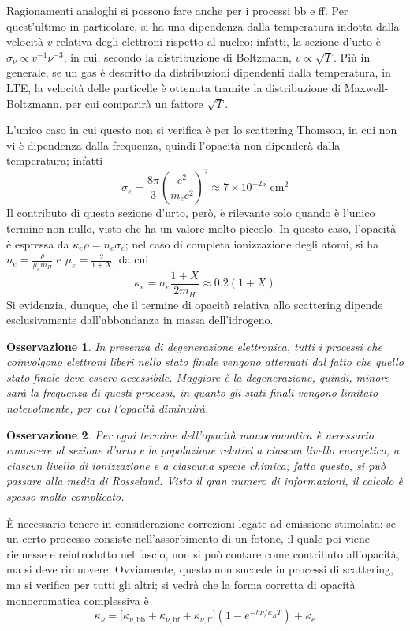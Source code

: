 \documentclass[11pt, a4paper]{scrartcl}
\theoremstyle{style}
\newtheorem{osservazione}{Osservazione}[section]
\theoremstyle{style1}
\numberwithin{equation}{subsection}
\begin{document}
Ragionamenti analoghi si possono fare anche per i processi bb e ff.
Per quest'ultimo in particolare, si ha una dipendenza dalla temperatura indotta dalla velocit\`a $v$ relativa degli elettroni rispetto al nucleo; infatti, la sezione d'urto \`e $\sigma _\nu  \propto v^{-1} \nu ^{-3}$, in cui, secondo la distribuzione di Boltzmann, $v \propto \sqrt{T}$.
Pi\`u in generale, se un gas \`e descritto da distribuzioni dipendenti dalla temperatura, in LTE, la velocit\`a delle particelle \`e ottenuta tramite la distribuzione di Maxwell-Boltzmann, per cui comparir\`a un fattore $\sqrt{T} $.

L'unico caso in cui questo non si verifica \`e per lo scattering Thomson, in cui non vi \`e dipendenza dalla frequenza, quindi l'opacit\`a non dipender\`a dalla temperatura; infatti
\[
\sigma _e = \frac{8 \pi}{ 3} \left(\frac{e^2}{m_ec^2}\right) ^2 \approx 7 \times 10 ^{-25} \text{ cm}^2
\] 
Il contributo di questa sezione d'urto, per\`o, \`e rilevante solo quando \`e l'unico termine non-nullo, visto che ha un valore molto piccolo.
In questo caso, l'opacit\`a \`e espressa da $\kappa _e \rho  = n_e \sigma _e$; nel caso di completa ionizzazione degli atomi, si ha $n_e = \frac{\rho }{\mu _e m_H}$ e $\mu _e = \frac{2}{1+X}$, da cui
\[
\kappa _e = \sigma _e \frac{1+X}{2m_H} \approx 0.2 (1+X)
\] 
Si evidenzia, dunque, che il termine di opacit\`a relativa allo scattering dipende esclusivamente dall'abbondanza in massa dell'idrogeno.
\begin{osservazione}
	In presenza di degenerazione elettronica, tutti i processi che coinvolgono elettroni liberi nello stato finale vengono attenuati dal fatto che quello stato finale deve essere accessibile.
	Maggiore \`e la degenerazione, quindi, minore sar\`a la frequenza di questi processi, in quanto gli stati finali vengono limitato notevolmente, per cui l'opacit\`a diminuir\`a.
\end{osservazione}
\begin{osservazione}
	Per ogni termine dell'opacit\`a monocromatica \`e necessario conoscere al sezione d'urto e la popolazione relativi a ciascun livello energetico, a ciascun livello di ionizzazione e a ciascuna specie chimica; fatto questo, si pu\`o passare alla media di Rosseland.
	Visto il gran numero di informazioni, il calcolo \`e spesso molto complicato.
\end{osservazione}
\noindent \`E necessario tenere in considerazione correzioni legate ad emissione stimolata: se un certo processo consiste nell'assorbimento di un fotone, il quale poi viene riemesse e reintrodotto nel fascio, non si pu\`o contare come contributo all'opacit\`a, ma si deve rimuovere.
Ovviamente, questo non succede in processi di scattering, ma si verifica per tutti gli altri; si vedr\`a che la forma corretta di opacit\`a monocromatica complessiva \`e
\begin{equation}
	\kappa _\nu  = \big[\kappa _{\nu , \text{bb}} + \kappa _{\nu , \text{bf}}  + \kappa _{\nu , \text{ff}}   \big] \left(1 - e^{-h\nu /\kappa _B T}\right)  + \kappa _{e} 
\end{equation}
\end{document}
